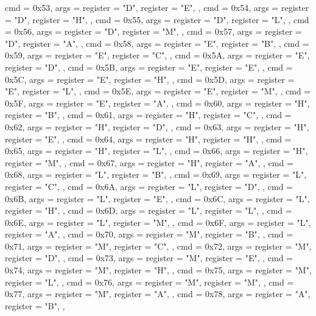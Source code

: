 {{        { cmd = 0x53, args = {{register = "D"}, {register = "E"}}, },
        { cmd = 0x54, args = {{register = "D"}, {register = "H"}}, },
        { cmd = 0x55, args = {{register = "D"}, {register = "L"}}, },
        { cmd = 0x56, args = {{register = "D"}, {register = "M"}}, },
        { cmd = 0x57, args = {{register = "D"}, {register = "A"}}, },
        { cmd = 0x58, args = {{register = "E"}, {register = "B"}}, },
        { cmd = 0x59, args = {{register = "E"}, {register = "C"}}, },
        { cmd = 0x5A, args = {{register = "E"}, {register = "D"}}, },
        { cmd = 0x5B, args = {{register = "E"}, {register = "E"}}, },
        { cmd = 0x5C, args = {{register = "E"}, {register = "H"}}, },
        { cmd = 0x5D, args = {{register = "E"}, {register = "L"}}, },
        { cmd = 0x5E, args = {{register = "E"}, {register = "M"}}, },
        { cmd = 0x5F, args = {{register = "E"}, {register = "A"}}, },
        { cmd = 0x60, args = {{register = "H"}, {register = "B"}}, },
        { cmd = 0x61, args = {{register = "H"}, {register = "C"}}, },
        { cmd = 0x62, args = {{register = "H"}, {register = "D"}}, },
        { cmd = 0x63, args = {{register = "H"}, {register = "E"}}, },
        { cmd = 0x64, args = {{register = "H"}, {register = "H"}}, },
        { cmd = 0x65, args = {{register = "H"}, {register = "L"}}, },
        { cmd = 0x66, args = {{register = "H"}, {register = "M"}}, },
        { cmd = 0x67, args = {{register = "H"}, {register = "A"}}, },
        { cmd = 0x68, args = {{register = "L"}, {register = "B"}}, },
        { cmd = 0x69, args = {{register = "L"}, {register = "C"}}, },
        { cmd = 0x6A, args = {{register = "L"}, {register = "D"}}, },
        { cmd = 0x6B, args = {{register = "L"}, {register = "E"}}, },
        { cmd = 0x6C, args = {{register = "L"}, {register = "H"}}, },
        { cmd = 0x6D, args = {{register = "L"}, {register = "L"}}, },
        { cmd = 0x6E, args = {{register = "L"}, {register = "M"}}, },
        { cmd = 0x6F, args = {{register = "L"}, {register = "A"}}, },
        { cmd = 0x70, args = {{register = "M"}, {register = "B"}}, },
        { cmd = 0x71, args = {{register = "M"}, {register = "C"}}, },
        { cmd = 0x72, args = {{register = "M"}, {register = "D"}}, },
        { cmd = 0x73, args = {{register = "M"}, {register = "E"}}, },
        { cmd = 0x74, args = {{register = "M"}, {register = "H"}}, },
        { cmd = 0x75, args = {{register = "M"}, {register = "L"}}, },
        { cmd = 0x76, args = {{register = "M"}, {register = "M"}}, },
        { cmd = 0x77, args = {{register = "M"}, {register = "A"}}, },
        { cmd = 0x78, args = {{register = "A"}, {register = "B"}}, },
}}
